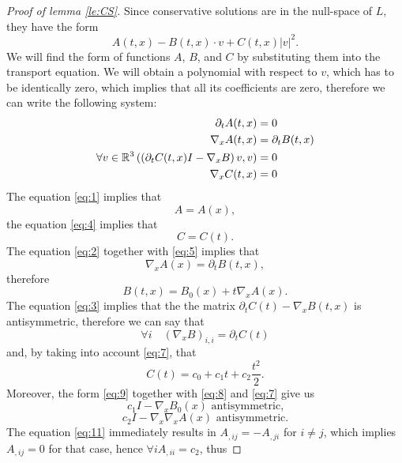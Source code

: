 \begin{subappendices}
\begin{proof}[Proof of lemma \ref{le:CS}]
Since conservative solutions are in the null-space of $L$, they have the form
\[A(t,x)-B(t,x)\cdot v+C(t,x)|v|^2.\]
We will find the form of functions $A$, $B$, and $C$ by substituting them into the transport equation. We will obtain a polynomial with respect to $v$, which has to be identically zero, which implies that all its coefficients are zero, therefore we can write the following system:
\begin{align}
	\partial_t A(t,x)&= 0\label{eq:1}\\
	\nabla_x A(t,x)&= \partial_t B(t,x)\label{eq:2}\\
	\forall v\in{\mathbb R^3}\left( \left( \partial_tC(t,x)I-\nabla_x B \right)v,v \right)&= 0\label{eq:3}\\
	\nabla_x C(t,x)&= 0\label{eq:4}
\end{align}
The equation \eqref{eq:1} implies that\begin{equation}
	A=A(x),
	\label{eq:5}
\end{equation}
the equation \eqref{eq:4} implies that \begin{equation}
	C=C(t).
	\label{eq:6}
\end{equation}The equation \eqref{eq:2} together with \eqref{eq:5} implies that \[\nabla_x A(x)=\partial_t B(t,x),\]therefore
\begin{equation}
	B(t,x)=B_0(x)+t\nabla_x A(x).
	\label{eq:7}
\end{equation}
The equation \eqref{eq:3} implies that the the matrix $\partial_t C(t)-\nabla_x B(t,x)$ is antisymmetric, therefore we can say that \begin{equation}
	\forall i\quad (\nabla_x B)_{i,i}=\partial_t C(t)
	\label{eq:8}
\end{equation}
and, by taking into account \eqref{eq:7}, that
\begin{equation}
	C(t) = c_0+c_1t+c_2\frac{t^2}{2}.
	\label{eq:9}
\end{equation}
Moreover, the form \eqref{eq:9} together with \eqref{eq:8} and \eqref{eq:7} give us 
\begin{equation}
	c_1I-\nabla_x B_0(x) \mbox{ antisymmetric,}
	\label{eq:10}
\end{equation}
\begin{equation}
	c_2I-\nabla_x \nabla_xA(x) \mbox{ antisymmetric.}
	\label{eq:11}
\end{equation}
The equation \eqref{eq:11} immediately results in  $A_{,ij}=-A_{,ji}$ for $i\ne j$, which implies $A_{,ij}=0$ for that case, hence $\forall i A_{,ii}=c_2$, thus

\end{proof}
\end{subappendices}
